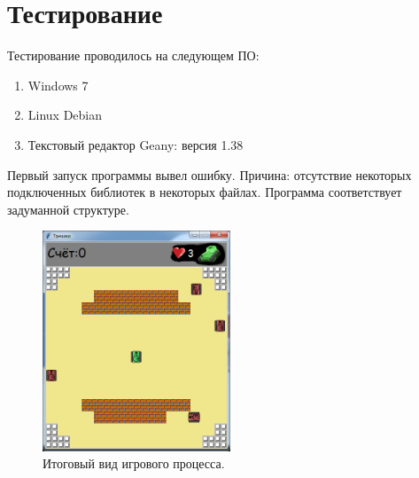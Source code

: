 \section{\label{sec:ch02/sec04}Тестирование}
Тестирование проводилось на следующем ПО:
\begin{enumerate}
\item Windows 7
\item Linux Debian
\item Текстовый редактор Geany: версия 1.38
\end{enumerate}
Первый запуск программы вывел ошибку. Причина: отсутствие некоторых подключенных библиотек в некоторых файлах. Программа соответствует задуманной структуре.
\begin{figure}[h]
    \centering
    \includegraphics[width=0.5\textwidth]{./images/game_process.png}
    \caption{\centering\label{fig:example05}Итоговый вид игрового процесса.}
\end{figure}